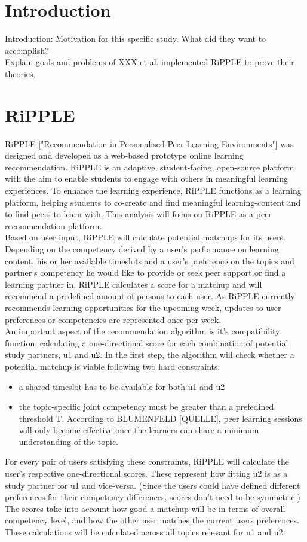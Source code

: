 \documentclass[nochapterpage,bigchapter,linedtoc,longdoc,colorback,accentcolor=tud3b]{tudreport}
\begin{document}
\section{Introduction}
Introduction: Motivation for this specific study. What did they want to accomplish?\\
Explain goals and problems of 
XXX et al. implemented RiPPLE to prove their theories. 
\section{RiPPLE}
RiPPLE ["Recommendation in Personalised Peer Learning Environments"] was designed and developed as a web-based prototype online learning recommendation. RiPPLE is an adaptive, student-facing, open-source platform with the aim to enable students to engage with others in meaningful learning experiences. To enhance the learning experience, RiPPLE functions as a learning platform, helping students to co-create and find meaningful learning-content and to find peers to learn with. This analysis will focus on RiPPLE as a peer recommendation platform.\\
Based on user input, RiPPLE will calculate potential matchups for its users. Depending on the competency derived by a user's performance on learning content, his or her available timeslots and a user's preference on the topics and partner's competency he would like to provide or seek peer support or find a learning partner in, RiPPLE calculates a score for a matchup and will recommend a predefined amount of persons to each user. As RiPPLE currently recommends learning opportunities for the upcoming week, updates to user preferences or competencies are represented once per week.\\
An important aspect of the recommendation algorithm is it's compatibility function, calculating a one-directional score for each combination of potential study partners, u1 and u2. In the first step, the algorithm will check whether a potential matchup is viable following two hard constraints:
\begin{itemize}
	\item a shared timeslot has to be available for both u1 and u2
	\item the topic-specific joint competency must be greater than a prefedined threshold T. According to BLUMENFELD [QUELLE], peer learning sessions will only become effective once the learners can share a minimum understanding of the topic.
\end{itemize}
For every pair of users satisfying these constraints, RiPPLE will calculate the user's respective one-directional scores. These represent how fitting u2 is as a study partner for u1 and vice-versa. (Since the users could have defined different preferences for their competency differences, scores don't need to be symmetric.) The scores take into account how good a matchup will be in terms of overall competency level, and how the other user matches the current users preferences. These calculations will be calculated across all topics relevant for u1 and u2.\\
\end{document}
